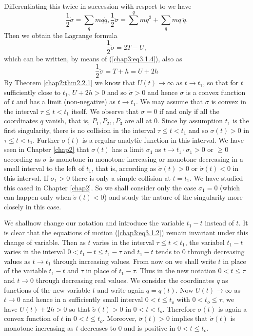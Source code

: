 Differentiating this twice in succession with respect to we have  
\begin{equation*}
\frac{1}{2} \dot{\sigma} = \sum\limits_q mq \dot{q}, \frac{1}{2}
\ddot{\sigma} = \sum\limits^q m\dot{q}^2  + \sum\limits_q mq \;
\ddot{q}.\tag{3.1.8}\label{chap3:eq3.1.8} 
\end{equation*}\pageoriginale
Then we obtain the Lagrange formula
\begin{equation*}
\frac{1}{2} \ddot{\sigma} =  2T - U, \tag{3.1.9}\label{chap3:eq3.1.9} 
\end{equation*}
which can be written, by means of (\ref{chap3:eq3.1.4}), also as 
\begin{equation*}
\frac{1}{2} \ddot{\sigma} = T + h = U +
2h\tag{3.1.10}\label{chap3:eq3.1.10} 
\end{equation*}
By Theorem \ref{chap2:thm2.2.1} we know that $U(t) \to \infty$ as $t
\to t_1$, so that for $t$ sufficiently close to $t_1$, $U + 2h >0$ and
so $\ddot{\sigma} > 0$ and hence $\sigma$ is a convex function of $t$
and has a limit (non-negative) as $t \to t_1$. We may assume that
$\sigma$ is convex in the interval $\tau \leq t < t_1$ itself. We
observe that $\sigma = 0$ if and only if all the coordinates $q$
vanish, that is, $P_1, P_2, ,P_3$ are all at 0. Since by assumption
$t_1$ is the first singularity, there is no collision in the interval
$\tau \leq t < t_1$ and so $\sigma (t) >0$ in $\tau \leq t  <
t_1$. Further $\sigma (t)$ is a regular analytic function  in this
interval. We have seen in Chapter \ref{chap2} that $\sigma (t)$  has a
limit $\sigma_1$ as $t \to t_1 \cdot \sigma_1>0$ or $ \geq 0$
according as $\sigma$ is monotone in monotone increasing or monotone
decreasing in a small interval to the left of $t_1$, that is,
according as $\dot{\sigma} (t) > 0$ or $\dot{\sigma} (t) <  0$ in this
interval. If $\sigma_1>0$ there is only a simple collision at $t =
t_1$. We have studied this cased in Chapter \ref{chap2}. So we shall
consider only the case $\sigma_1 =0$ (which can happen only when
$\dot{\sigma} (t) < 0$) and study the nature of the singularity more
closely in this case.  

We shall\pageoriginale now change our notation and introduce the
variable $t_1 - t$ instead of $t$. It is clear that the equations of
motion (\ref{chap3:eq3.1.2}) remain invariant under this change of
variable. Then as $t$ varies in the interval $\tau \leq t < t_1$, the
variabel $t_1 - t$ varies in the interval $0 < t_1 - t\leq t_1 - \tau$
and $t_1 - t$ tends to 0 through decreasing values as $t \to t_1$
through increasing values. From now on we shall write $t$ in place of
the variable $t_1 -t$ and $\tau$ in place of $t_1 -\tau$. Thus in the
new notation $0 < t\leq \tau$ and $t \to 0$ through decreasing real
values. We consider the coordinates $q$ as functions of the new
variable $t$ and write again $q = q(t)$. Now $U(t) \to \infty$ as $t
\to 0$ and hence in a sufficiently small interval $0 < t \leq t_o$
with $0 < t_o \leq \tau$, we have $U(t) + 2h >0$ so that
$\ddot{\sigma} (t) >0$ in $0 < t< t_o$. Therefore $\sigma(t)$ is again
a convex function of $t$ in $0 <t\leq t_o$. Moreover, $\ddot{\sigma}
(t) >0$ implies that $\dot{\sigma} (t)$ is monotone increasing as $t$
decreases to 0 and is positive in $0 < t \leq t_o$. 


